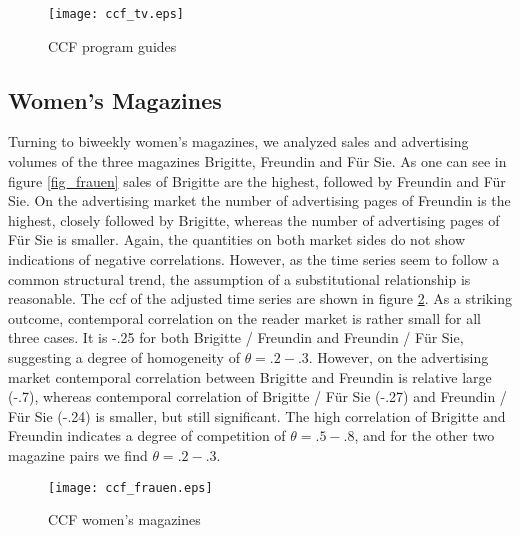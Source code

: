 \documentclass[12pt,a4paper]{scrreprt}
\begin{document}
\begin{figure}[H]
\caption{CCF program guides}
\label{fig_ccf_tv}
	\centering
	\texttt{[image: ccf\_tv.eps]}
\end{figure}


\subsection{Women's Magazines}
Turning to biweekly women's magazines, we analyzed sales and advertising volumes of the three magazines Brigitte, Freundin and Für Sie. As one can see in figure \ref{fig_frauen} sales of Brigitte are the highest, followed by Freundin and Für Sie. On the advertising market the number of advertising pages of Freundin is the highest, closely followed by Brigitte, whereas the number of advertising pages of Für Sie is smaller. Again, the quantities on both market sides do not show indications of negative correlations. However, as the time series seem to follow a common structural trend, the assumption of a substitutional relationship is reasonable. The ccf of the adjusted time series are shown in figure \ref{fig_ccf_frauen}. As a striking outcome, contemporal correlation on the reader market is rather small for all three cases. It is -.25 for both Brigitte / Freundin and Freundin / Für Sie, suggesting a degree of homogeneity of $\theta=.2-.3$. However, on the advertising market contemporal correlation between Brigitte and Freundin is relative large (-.7), whereas contemporal correlation of Brigitte / Für Sie (-.27) and Freundin / Für Sie (-.24) is smaller, but still significant. The high correlation of Brigitte and Freundin indicates a degree of competition of $\theta=.5-.8$, and for the other two magazine pairs we find $\theta=.2-.3$. 


\begin{figure}[H]
\caption{CCF women's magazines}
\label{fig_ccf_frauen}
	\centering
	\texttt{[image: ccf\_frauen.eps]}
\end{figure}
\end{document}
